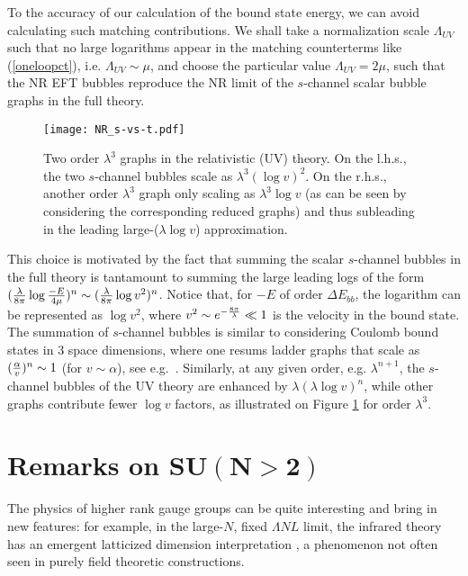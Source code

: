 \documentclass[11pt]{article}
\begin{document}
To the accuracy of our calculation of the bound state energy, we can avoid calculating such matching contributions. We shall take a normalization scale $\Lambda_{UV}$ such that  no large logarithms appear in the matching counterterms like (\ref{oneloopct}), i.e. $\Lambda_{UV} \sim \mu$, and   choose the particular value $\Lambda_{UV} = 2 \mu$, such that the NR EFT bubbles reproduce the NR limit of the $s$-channel scalar bubble graphs in the full theory. 
\begin{figure}[t] %
   \centering
   \texttt{[image: NR\_s-vs-t.pdf]} 
   \caption{Two order $\lambda^3$ graphs in the relativistic (UV) theory. On the l.h.s., the two $s$-channel bubbles scale as $\lambda^3 (\log v)^2$. On the r.h.s., another order $\lambda^3$ graph only scaling as $\lambda^3  \log v $ (as can be seen by considering the corresponding reduced graphs)  and thus subleading in the leading large-($\lambda \log v$) approximation.}
	\label{sbubbles4}
\end{figure}
This choice is motivated by the fact that summing the scalar $s$-channel bubbles in the full theory is tantamount to summing the large leading logs of the form $({\lambda \over 8 \pi} \log{-E\over 4 \mu})^n \sim ({\lambda \over 8 \pi}  \log v^2)^n$. Notice that, for $- E$ of order $\Delta E_{bb}$, the logarithm can be represented as $\log v^2$, where $v^2 \sim e^{- {8 \pi \over \lambda}} \ll 1$ is the velocity in the bound state. 
The summation of $s$-channel bubbles is similar  to considering Coulomb bound states in 3 space dimensions, where one resums ladder graphs that scale as $({\alpha \over v})^n \sim 1$ (for $v\sim \alpha$), see e.g.~\cite{Luke:1996hj}. Similarly, at any given order, e.g. $\lambda^{n+1}$,  the $s$-channel bubbles of the UV theory are enhanced by $\lambda (\lambda  \log v)^{n}$, while other graphs contribute fewer $\log v$ factors, as illustrated on Figure \ref{sbubbles4} for order $\lambda^3$.

 \section{Remarks on $\mathbf{SU(N>2)}$}
 \label{suN}
 
 The physics of higher rank gauge groups can be quite interesting and bring in new features: for example, in the large-$N$, fixed $\Lambda N L$ limit, the infrared theory has an emergent latticized dimension interpretation \cite{Cherman:2016jtu}, a phenomenon not often seen in purely field theoretic constructions.
 
\end{document}
